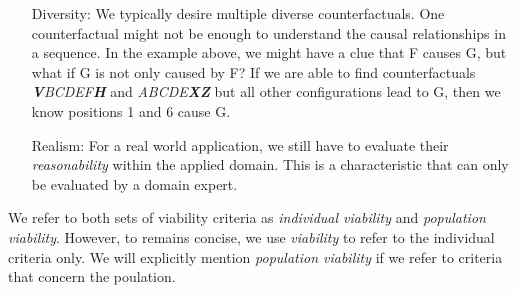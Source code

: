 \documentclass[./../../paper.tex]{subfiles}
\begin{document}
\begin{itemize}
    \item[Diversity:] We typically desire multiple diverse counterfactuals. One counterfactual might not be enough to understand the causal relationships in a sequence. In the example above, we might have a clue that F causes G, but what if G is not only caused by F? If we are able to find counterfactuals \textit{\textbf{V}BCDEF\textbf{H}} and \textit{ABCDE\textbf{XZ}} but all other configurations lead to G, then we know positions 1 and 6 cause G. 
    \item[Realism:] For a real world application, we still have to evaluate their \emph{reasonability} within the applied domain. This is a characteristic that can only be evaluated by a domain expert. 
\end{itemize}

We refer to both sets of viability criteria as \emph{individual viability} and \emph{population viability}. However, to remains concise, we use \emph{viability} to refer to the individual criteria only. We will explicitly mention \emph{population viability} if we refer to criteria that concern the poulation.
\end{document}
